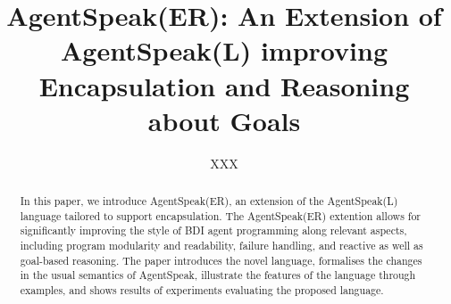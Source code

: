 \documentclass{llncs}
\begin{document}
\title{AgentSpeak(ER): An Extension of AgentSpeak(L) improving
  Encapsulation and Reasoning about Goals}




\author{XXX}

\maketitle

\begin{abstract}  
  In this paper, we introduce AgentSpeak(ER), an extension of the
  AgentSpeak(L) language tailored to support encapsulation. The
  AgentSpeak(ER) extention allows for significantly improving the
  style of BDI agent programming along relevant aspects, including
  program modularity and readability, failure handling, and reactive
  as well as goal-based reasoning. The paper introduces the novel
  language, formalises the changes in the usual semantics of
  AgentSpeak, illustrate the features of the language through
  examples, and shows results of experiments evaluating the proposed
  language.
\end{abstract}

















\end{document}
